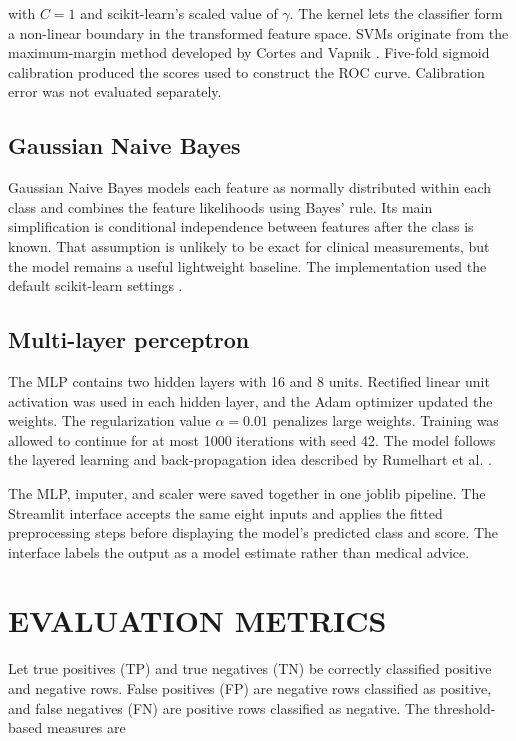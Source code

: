 \documentclass[pdflatex,sn-vancouver-num]{sn-jnl}
\begin{document}
with $C=1$ and scikit-learn's scaled value of $\gamma$. The kernel lets the classifier form a non-linear boundary in the transformed feature space. SVMs originate from the maximum-margin method developed by Cortes and Vapnik \cite{cortes1995svm}. Five-fold sigmoid calibration produced the scores used to construct the ROC curve. Calibration error was not evaluated separately.

\subsection{Gaussian Naive Bayes}\label{subsec:nb}

Gaussian Naive Bayes models each feature as normally distributed within each class and combines the feature likelihoods using Bayes' rule. Its main simplification is conditional independence between features after the class is known. That assumption is unlikely to be exact for clinical measurements, but the model remains a useful lightweight baseline. The implementation used the default scikit-learn settings \cite{pedregosa2011scikit}.

\subsection{Multi-layer perceptron}\label{subsec:mlp}

The MLP contains two hidden layers with 16 and 8 units. Rectified linear unit activation was used in each hidden layer, and the Adam optimizer updated the weights. The regularization value $\alpha=0.01$ penalizes large weights. Training was allowed to continue for at most 1000 iterations with seed 42. The model follows the layered learning and back-propagation idea described by Rumelhart et al. \cite{rumelhart1986backprop}.

The MLP, imputer, and scaler were saved together in one joblib pipeline. The Streamlit interface accepts the same eight inputs and applies the fitted preprocessing steps before displaying the model's predicted class and score. The interface labels the output as a model estimate rather than medical advice.

\section{EVALUATION METRICS}\label{sec:metrics}

Let true positives (TP) and true negatives (TN) be correctly classified positive and negative rows. False positives (FP) are negative rows classified as positive, and false negatives (FN) are positive rows classified as negative. The threshold-based measures are
\end{document}
